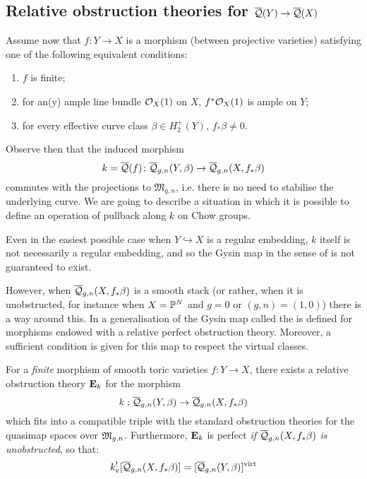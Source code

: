\subsection{Relative obstruction theories for $\overline{\mathcal{Q}}(Y)\rightarrow\overline{\mathcal{Q}}(X)$}\label{section:rel_pot_for_qm_functoriality}
Assume now that $f\colon Y\to X$ is a morphism (between projective varieties) satisfying one of the following equivalent conditions:
\begin{enumerate}
 \item $f$ is finite;
 \item for an(y) ample line bundle $\mathcal{O}_X(1)$ on $X$, $f^*\mathcal{O}_X(1)$ is ample on $Y$;
 \item for every effective curve class $\beta\in H_2^+(Y)$, $f_*\beta\neq 0$.
\end{enumerate}
Observe then that the induced morphism $$k=\overline{\mathcal{Q}}(f) \colon \overline{\mathcal Q}_{g,n}(Y,\beta) \rightarrow \overline{\mathcal Q}_{g,n}(X,f_* \beta)$$ commutes with the projections to $\mathfrak M_{g,n}$, i.e. there is no need to stabilise the underlying curve. We are going to describe a situation in which it is possible to define an operation of pullback along $k$ on Chow groups.

Even in the easiest possible case when $Y \hookrightarrow X$ is a regular embedding, $k$ itself is not necessarily a regular embedding, and so the Gysin map in the sense of \cite{FUL} is not guaranteed to exist.

However, when $\overline{\mathcal Q}_{g,n}(X,f_* \beta)$ is a smooth stack (or rather, when it is unobstructed, for instance when $X=\mathbb P^N$ and $g=0$ or $(g,n)=(1,0)$) there is a way around this. In \cite{Manolache-Pull} a generalisation of the Gysin map called the  is defined for morphisms endowed with a relative perfect obstruction theory. Moreover, a sufficient condition is given \cite[Corollary 4.9]{Manolache-Pull} for this map to respect the virtual classes.

\begin{lem} \label{Exists relative POT} For a \emph{finite} morphism of smooth toric varieties $f\colon Y\to X$, there exists a relative obstruction theory $\mathbf{E}_k$ for the morphism
\begin{equation*} k : \overline{\mathcal Q}_{g,n}(Y,\beta) \rightarrow \overline{\mathcal Q}_{g,n}(X,f_*\beta) \end{equation*}
which fits into a compatible triple with the standard obstruction theories for the quasimap spaces over $\mathfrak M_{g,n}$. Furthermore, $\mathbf{E}_k$ is perfect \emph{if $\overline{\mathcal Q}_{g,n}(X,f_*\beta)$ is unobstructed}, so that:
\begin{equation*} k^!_{\operatorname{v}} [ \overline{\mathcal Q}_{g,n}(X,f_*\beta) ] = [\overline{\mathcal Q}_{g,n}(Y,\beta)]^{\operatorname{virt}} \end{equation*} \end{lem}

